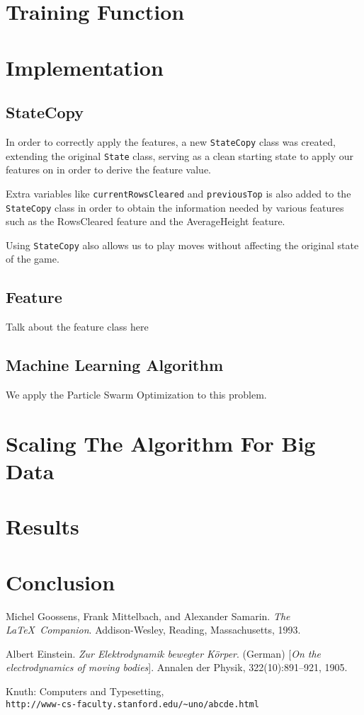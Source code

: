 \documentclass[12pt]{article}
\begin{document}
\section{Training Function}

\section{Implementation}
\subsection{StateCopy}
In order to correctly apply the features, a new \texttt{StateCopy} class was created, extending the original \texttt{State} class, serving as a clean starting state to apply our features on in order to derive the feature value.

Extra variables like \texttt{currentRowsCleared} and \texttt{previousTop} is also added to the \texttt{StateCopy} class in order to obtain the information needed by various features such as the RowsCleared feature and the AverageHeight feature.

Using \texttt{StateCopy} also allows us to play moves without affecting the original state of the game.

\subsection{Feature}
Talk about the feature class here

\subsection{Machine Learning Algorithm}
We apply the Particle Swarm Optimization to this problem. 
\section{Scaling The Algorithm For Big Data}

\section{Results}

\section{Conclusion}



\begin{thebibliography}{12}
Michel Goossens, Frank Mittelbach, and Alexander Samarin. 
\textit{The \LaTeX\ Companion}. 
Addison-Wesley, Reading, Massachusetts, 1993.
 
Albert Einstein. 
\textit{Zur Elektrodynamik bewegter K{\"o}rper}. (German) 
[\textit{On the electrodynamics of moving bodies}]. 
Annalen der Physik, 322(10):891–921, 1905.
 
Knuth: Computers and Typesetting,
\\\texttt{http://www-cs-faculty.stanford.edu/\~{}uno/abcde.html}
\end{thebibliography}
\end{document}
